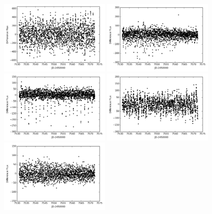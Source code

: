 \begin{figure}[p]
\begin{center}
\includegraphics[width=0.48\textwidth]{figures/cdi/f6a}
\includegraphics[width=0.48\textwidth]{figures/cdi/f6b}
\includegraphics[width=0.48\textwidth]{figures/cdi/f6c}
\includegraphics[width=0.48\textwidth]{figures/cdi/f6d}
\includegraphics[width=0.48\textwidth]{figures/cdi/f6e}

\end{center}
\end{figure}
